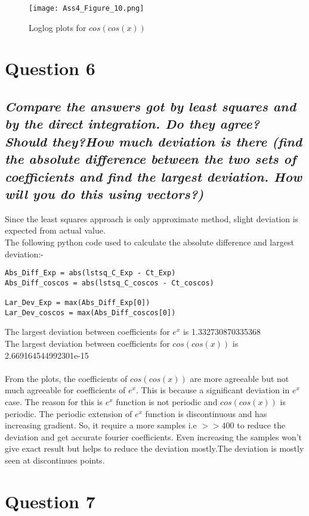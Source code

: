 \documentclass[11pt, a4paper]{article}
\begin{document}
   \begin{figure}[!tbh]
   	\centering
   	\texttt{[image: Ass4\_Figure\_10.png]}   
   	\caption{Loglog plots for $cos(cos(x))$}
   	\label{fig:sample}
   \end{figure} 
   \cleardoublepage
   
     

\section{Question 6} 
\subsection*{\textsl{Compare the answers got by least squares and by the direct integration. Do they agree? Should they?How much deviation is there (find the absolute difference between the two sets of coefficients and find the largest deviation. How will you do this using vectors?)}}
Since the least squares approach is only approximate method, slight deviation is expected from actual value.\\
The following python code used to calculate the absolute difference and largest deviation:-
\begin{verbatim}	
Abs_Diff_Exp = abs(lstsq_C_Exp - Ct_Exp)  
Abs_Diff_coscos = abs(lstsq_C_coscos - Ct_coscos)

Lar_Dev_Exp = max(Abs_Diff_Exp[0]) 
Lar_Dev_coscos = max(Abs_Diff_coscos[0])
\end{verbatim}
The largest deviation between coefficients for $e^{x}$ is 1.332730870335368\\
The largest deviation between coefficients for $cos(cos(x))$ is  2.669164544992301e-15\\\\
From the plots, the coefficients of $cos(cos(x))$ are more agreeable but not much agreeable for coefficients of $e^{x}$. This is because a significant deviation in $e^x$ case. The reason for this is $e^{x}$ function is not periodic and  $cos(cos(x))$ is periodic. The periodic extension of $e^{x}$ function is discontinuous and has increasing gradient. So, it require a more samples i.e $>>400$ to reduce the deviation and get accurate fourier coefficients. Even increasing the samples won't give exact result but helps to reduce the deviation mostly.The deviation is mostly seen at discontinues points.   


\section{Question 7}
\end{document}

